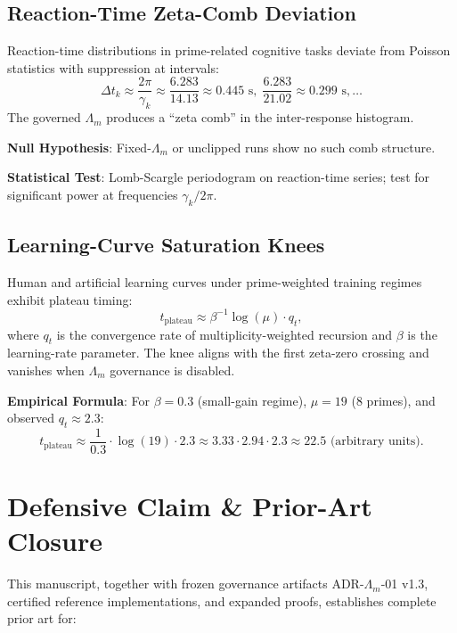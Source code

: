 \documentclass[11pt,a4paper]{article}
\theoremstyle{plain}
\theoremstyle{definition}
\theoremstyle{remark}
\begin{document}
\subsection{Reaction-Time Zeta-Comb Deviation}

\begin{prediction}\label{pred:rt}
Reaction-time distributions in prime-related cognitive tasks deviate from Poisson statistics with suppression at intervals:
\[
\Delta t_k \approx \frac{2\pi}{\gamma_k} \approx \frac{6.283}{14.13} \approx 0.445 \text{ s}, \; \frac{6.283}{21.02} \approx 0.299 \text{ s}, \ldots
\]
The governed \(\Lambda_m\) produces a ``zeta comb'' in the inter-response histogram.
\end{prediction}

\textbf{Null Hypothesis}: Fixed-\(\Lambda_m\) or unclipped runs show no such comb structure.

\textbf{Statistical Test}: Lomb-Scargle periodogram on reaction-time series; test for significant power at frequencies \(\gamma_k/2\pi\).

\subsection{Learning-Curve Saturation Knees}

\begin{prediction}\label{pred:learning}
Human and artificial learning curves under prime-weighted training regimes exhibit plateau timing:
\[
t_{\text{plateau}} \approx \beta^{-1} \log(\mu) \cdot q_t,
\]
where \(q_t\) is the convergence rate of multiplicity-weighted recursion and \(\beta\) is the learning-rate parameter. The knee aligns with the first zeta-zero crossing and vanishes when \(\Lambda_m\) governance is disabled.
\end{prediction}

\textbf{Empirical Formula}: For \(\beta = 0.3\) (small-gain regime), \(\mu = 19\) (8 primes), and observed \(q_t \approx 2.3\):
\[
t_{\text{plateau}} \approx \frac{1}{0.3} \cdot \log(19) \cdot 2.3 \approx 3.33 \cdot 2.94 \cdot 2.3 \approx 22.5 \text{ (arbitrary units)}.
\]

\section{Defensive Claim \& Prior-Art Closure}

This manuscript, together with frozen governance artifacts ADR-\(\Lambda_m\)-01 v1.3, certified reference implementations, and expanded proofs, establishes complete prior art for:
\end{document}
